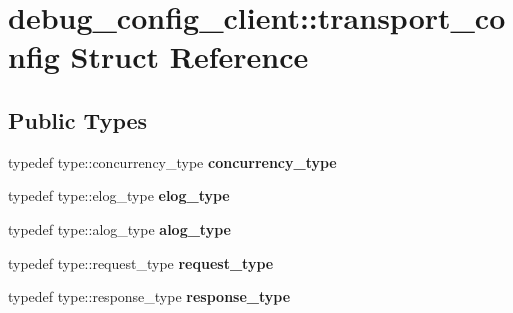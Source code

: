 \hypertarget{structdebug__config__client_1_1transport__config}{}\section{debug\+\_\+config\+\_\+client\+:\+:transport\+\_\+config Struct Reference}
\label{structdebug__config__client_1_1transport__config}
\subsection*{Public Types}
\begin{DoxyCompactItemize}
\item 
\mbox{\label{structdebug__config__client_1_1transport__config_add8b23c69a9f263affc779a55491f36a}} 
typedef type\+::concurrency\+\_\+type {\bfseries concurrency\+\_\+type}
\item 
\mbox{\label{structdebug__config__client_1_1transport__config_a45a5ad533dadb37ec3e6a3c76f0ed6b3}} 
typedef type\+::elog\+\_\+type {\bfseries elog\+\_\+type}
\item 
\mbox{\label{structdebug__config__client_1_1transport__config_a6c713b8f7f93d8622c7536b7c72656e1}} 
typedef type\+::alog\+\_\+type {\bfseries alog\+\_\+type}
\item 
\mbox{\label{structdebug__config__client_1_1transport__config_a5c1f1f03a8724347f47432609aad533a}} 
typedef type\+::request\+\_\+type {\bfseries request\+\_\+type}
\item 
\mbox{\label{structdebug__config__client_1_1transport__config_a814f5a7e882ba6a20c593df74682ad4b}} 
typedef type\+::response\+\_\+type {\bfseries response\+\_\+type}
\end{DoxyCompactItemize}
